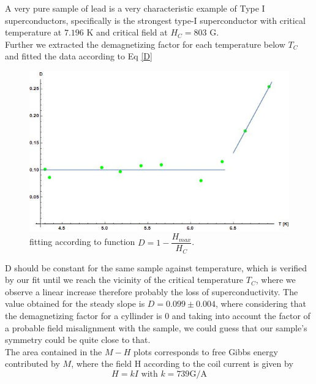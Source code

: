 \documentclass[openany,11pt,a4paper]{report}
\begin{document}
A very pure sample of lead is a very characteristic example of Type I superconductors, specifically is the strongest type-I superconductor with critical temperature at $7.196$ K and critical field at $H_{C}=803$ G.\\

Further we extracted the demagnetizing factor for each temperature below $T_{C}$ and fitted the data according to Eq \ref{D}

\begin{figure}[H]
\centering
\caption{fitting according to function $D= 1- \dfrac{H_{max}}{H_{C}}$.}
\includegraphics[scale=.8]{DT.jpg}
\end{figure}

D should be constant for the same sample against temperature, which is verified by our fit until we reach the vicinity of the critical temperature $T_{C}$, where we observe a linear increase therefore probably the loss of superconductivity. The value obtained for the steady slope is $D=0.099 \pm 0.004$, where considering that the demagnetizing factor for a cyllinder is $0$ and taking into account the factor of a probable field misalignment with the sample, we could guess that our sample's symmetry could be quite close to that.\\

The area contained in the $M-H$ plots corresponds to free Gibbs energy contributed by $M$, where the field H according to the coil current is given by
\begin{equation}
H=k I  \text { with } k=739 \mathrm{G} / \mathrm{A}
\end{equation}
\end{document}
